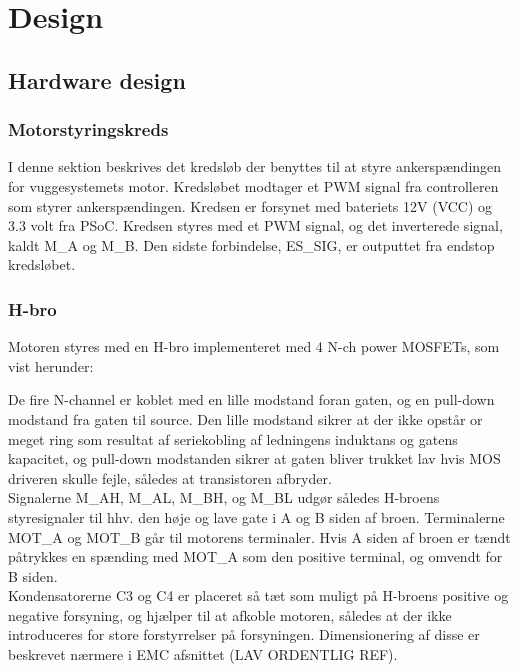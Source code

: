 \section{Design}
\subsection{Hardware design}

\subsubsection{Motorstyringskreds}
I denne sektion beskrives det kredsløb der benyttes til at styre ankerspændingen for vuggesystemets motor. Kredsløbet modtager et PWM signal fra controlleren som styrer ankerspændingen. Kredsen er forsynet med bateriets 12V (VCC) og 3.3 volt fra PSoC. Kredsen styres med et PWM signal, og det inverterede signal, kaldt M\_A og M\_B. Den sidste forbindelse, ES\_SIG, er outputtet fra endstop kredsløbet.\\


\subsubsection*{H-bro}
\label{Vuggesytem:HW_DESIGN_HBRO} 
Motoren styres med en H-bro implementeret med 4 N-ch power MOSFETs, som vist herunder:


De fire N-channel er koblet med en lille modstand foran gaten, og en pull-down modstand fra gaten til source. Den lille modstand sikrer at der ikke opstår or meget ring som resultat af seriekobling af ledningens induktans og gatens kapacitet, og pull-down modstanden sikrer at gaten bliver trukket lav hvis MOS driveren skulle fejle, således at transistoren afbryder. \\ 
Signalerne M\_AH, M\_AL, M\_BH, og M\_BL udgør således H-broens styresignaler til hhv. den høje og lave gate i A og B siden af broen. Terminalerne MOT\_A og MOT\_B går til motorens terminaler. Hvis A siden af broen er tændt påtrykkes en spænding med MOT\_A som den positive terminal, og omvendt for B siden. \\
Kondensatorerne C3 og C4 er placeret så tæt som muligt på H-broens positive og negative forsyning, og hjælper til at afkoble motoren, således at der ikke introduceres for store forstyrrelser på forsyningen. Dimensionering af disse er beskrevet nærmere i EMC afsnittet (LAV ORDENTLIG REF).\\

